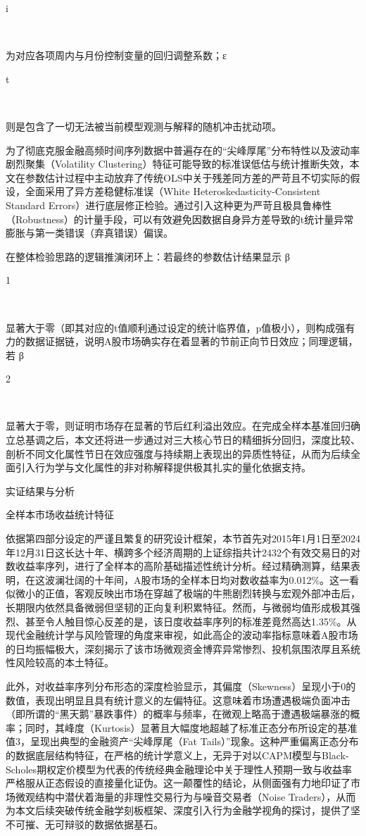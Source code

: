 \documentclass{cupb-thesis}
\begin{document}
i

​

为对应各项周内与月份控制变量的回归调整系数；ε

t

​

则是包含了一切无法被当前模型观测与解释的随机冲击扰动项。


为了彻底克服金融高频时间序列数据中普遍存在的“尖峰厚尾”分布特性以及波动率剧烈聚集（Volatility Clustering）特征可能导致的标准误低估与统计推断失效，本文在参数估计过程中主动放弃了传统OLS中关于残差同方差的严苛且不切实际的假设，全面采用了异方差稳健标准误（White Heteroskedasticity-Consistent Standard Errors）进行底层修正检验。通过引入这种更为严苛且极具鲁棒性（Robustness）的计量手段，可以有效避免因数据自身异方差导致的t统计量异常膨胀与第一类错误（弃真错误）偏误。


在整体检验思路的逻辑推演闭环上：若最终的参数估计结果显示 β

1

​

显著大于零（即其对应的t值顺利通过设定的统计临界值，p值极小），则构成强有力的数据证据链，说明A股市场确实存在着显著的节前正向节日效应；同理逻辑，若 β

2

​

显著大于零，则证明市场存在显著的节后红利溢出效应。在完成全样本基准回归确立总基调之后，本文还将进一步通过对三大核心节日的精细拆分回归，深度比较、剖析不同文化属性节日在效应强度与持续期上表现出的异质性特征，从而为后续全面引入行为学与文化属性的非对称解释提供极其扎实的量化依据支持。


实证结果与分析

全样本市场收益统计特征

依据第四部分设定的严谨且繁复的研究设计框架，本节首先对2015年1月1日至2024年12月31日这长达十年、横跨多个经济周期的上证综指共计2432个有效交易日的对数收益率序列，进行了全样本的高阶基础描述性统计分析。经过精确测算，结果表明，在这波澜壮阔的十年间，A股市场的全样本日均对数收益率为0.012\%。这一看似微小的正值，客观反映出市场在穿越了极端的牛熊剧烈转换与宏观外部冲击后，长期限内依然具备微弱但坚韧的正向复利积累特征。然而，与微弱均值形成极其强烈、甚至令人触目惊心反差的是，该日度收益率序列的标准差竟然高达1.35\%。从现代金融统计学与风险管理的角度来审视，如此高企的波动率指标意味着A股市场的日均振幅极大，深刻揭示了该市场微观资金博弈异常惨烈、投机氛围浓厚且系统性风险较高的本土特征。


此外，对收益率序列分布形态的深度检验显示，其偏度（Skewness）呈现小于0的数值，表现出明显且具有统计意义的左偏特征。这意味着市场遭遇极端负面冲击（即所谓的“黑天鹅”暴跌事件）的概率与频率，在微观上略高于遭遇极端暴涨的概率；同时，其峰度（Kurtosis）显著且大幅度地超越了标准正态分布所设定的基准值3，呈现出典型的金融资产“尖峰厚尾（Fat Tails）”现象。这种严重偏离正态分布的数据底层结构特征，在严格的统计学意义上，无异于对以CAPM模型与Black-Scholes期权定价模型为代表的传统经典金融理论中关于理性人预期一致与收益率严格服从正态假设的直接量化证伪。这一颠覆性的结论，从侧面强有力地印证了市场微观结构中潜伏着海量的非理性交易行为与噪音交易者（Noise Traders），从而为本文后续突破传统金融学刻板框架、深度引入行为金融学视角的探讨，提供了坚不可摧、无可辩驳的数据依据基石。
\end{document}
